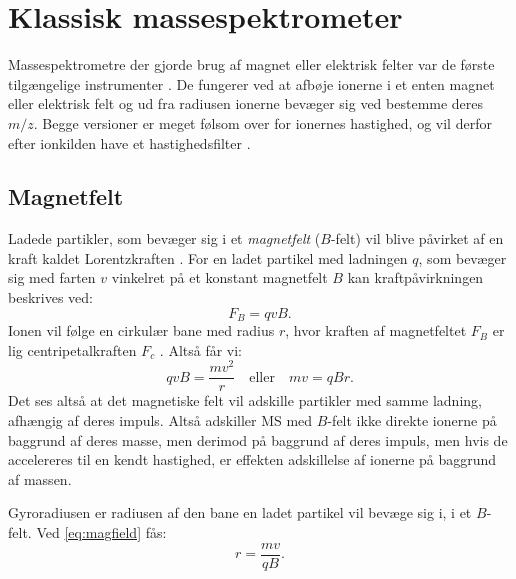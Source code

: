\section{Klassisk massespektrometer}
Massespektrometre der gjorde brug af magnet eller elektrisk felter var de første tilgængelige instrumenter \parencite{mstextbook}.
De fungerer ved at afbøje ionerne i et enten magnet eller elektrisk felt og ud fra radiusen ionerne bevæger sig ved bestemme deres $m/z$.
Begge versioner er meget følsom over for ionernes hastighed, og vil derfor efter ionkilden have et hastighedsfilter \parencite{orbitAstx}.
\subsection{Magnetfelt}
Ladede partikler, som bevæger sig i et \emph{magnetfelt} ($B$-felt) vil blive påvirket af en kraft kaldet Lorentzkraften \parencite{orbitAstx}.
For en ladet partikel med ladningen $q$, som bevæger sig med farten $v$ vinkelret på et konstant magnetfelt $B$ kan kraftpåvirkningen beskrives ved:
\begin{equation}
	F_B = qvB.
\end{equation}
Ionen vil følge en cirkulær bane med radius $r$, hvor kraften af magnetfeltet $F_B$ er lig centripetalkraften $F_c$ \parencite{orbitAstx}. Altså får vi:
\begin{equation}\label{eq:magfield}
	qvB = \frac{mv^2}{r}\quad\text{eller}\quad mv = qBr.
\end{equation}
Det ses altså at det magnetiske felt vil adskille partikler med samme ladning, afhængig af deres impuls.
Altså adskiller MS med $B$-felt ikke direkte ionerne på baggrund af deres masse, men derimod på baggrund af deres impuls,
men hvis de accelereres til en kendt hastighed, er effekten adskillelse af ionerne på baggrund af massen.
\par Gyroradiusen er radiusen af den bane en ladet partikel vil bevæge sig i, i et $B$-felt. Ved \cref{eq:magfield} fås:
\begin{equation}
	r = \frac{mv}{qB}.
\end{equation}
